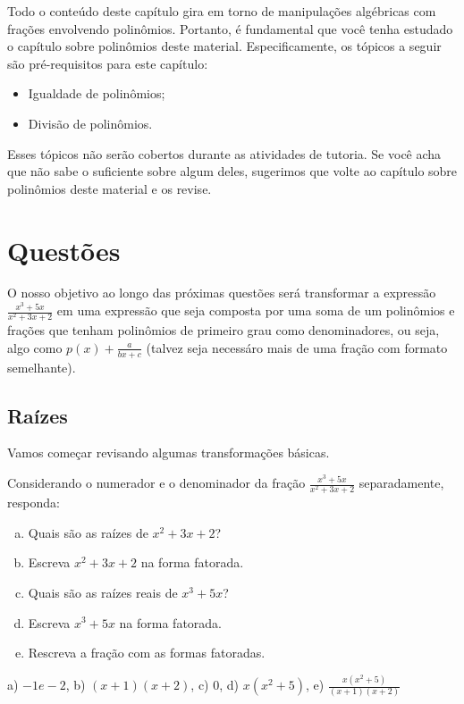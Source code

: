 \documentclass[main_estudante.tex]{subfiles}
\begin{document}
Todo o conteúdo deste capítulo gira em torno de manipulações algébricas com frações envolvendo polinômios. Portanto, é fundamental que você tenha estudado o capítulo sobre polinômios deste material. Especificamente, os tópicos a seguir são pré-requisitos para este capítulo:
\begin{itemize}
 \item Igualdade de polinômios;
 \item Divisão de polinômios.
\end{itemize}

Esses tópicos não serão cobertos durante as atividades de tutoria. Se você acha que não sabe o suficiente sobre algum deles, sugerimos que volte ao capítulo sobre polinômios deste material e os revise.

\newpage

\section{Questões}

O nosso objetivo ao longo das próximas questões será transformar a expressão $\frac{x^3+5x}{x^2+3x+2}$ em uma expressão que seja composta por uma soma de um polinômios e frações que tenham polinômios de primeiro grau como denominadores, ou seja, algo como $p(x)+\frac{a}{bx+c}$ (talvez seja necessáro mais de uma fração com formato semelhante).

\subsection*{Raízes}

Vamos começar revisando algumas transformações básicas.

\begin{questao}
Considerando o numerador e o denominador da fração $\frac{x^3+5x}{x^2+3x+2}$ separadamente, responda:
\begin{enumerate}[a)]
\item Quais são as raízes de $x^2+3x+2$?
\item Escreva $x^2+3x+2$ na forma fatorada.
\item Quais são as raízes reais de $x^3+5x$?
\item Escreva $x^3+5x$ na forma fatorada.
\item Rescreva a fração com as formas fatoradas.
\end{enumerate}
\end{questao}

\begin{gabarito}
	\begin{gabaritoQuestao}
		a) $-1 e -2$, b) $(x+1)(x+2)$, c) $0$, d) $x(x^2+5)$, e) $\frac{x(x^2+5)}{(x+1)(x+2)}$
	\end{gabaritoQuestao}
\end{gabarito}
\end{document}
